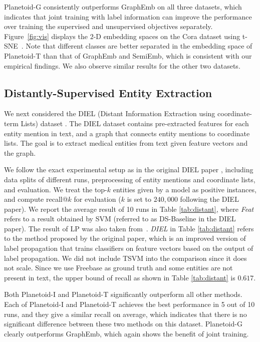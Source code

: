 Planetoid-G consistently outperforms GraphEmb on all three datasets, which indicates that joint training with label information can improve the performance over training the supervised and unsupervised objectives separately.
Figure~\ref{fig:vis} displays the $2$-D embedding spaces on the Cora dataset
using t-SNE~\cite{van2008visualizing}. Note that  
different classes are better separated in the embedding space of Planetoid-T than that of GraphEmb and SemiEmb, which is consistent with our empirical findings. We also observe similar results for the other two datasets.  



\subsection{Distantly-Supervised Entity Extraction}


We next considered the DIEL (Distant Information Extraction using coordinate-term Lists) dataset \cite{bingimproving}.
The DIEL dataset contains pre-extracted features for each entity mention in text, and a graph that connects entity mentions to coordinate lists. The goal is to extract medical entities from text given feature vectors and the graph.

We follow the exact experimental setup as in the original DIEL paper \cite{bingimproving}, including data splits of different runs, preprocessing of entity mentions and coordinate lists, and evaluation. We treat the top-$k$ entities given by a model as positive instances, and compute recall@$k$ for evaluation ($k$ is set to $240,000$ following the DIEL paper). We report the average result of 10 runs in Table \ref{tab:distant}, where \textit{Feat} refers to a result obtained by SVM (referred to as DS-Baseline in the DIEL paper). The result of LP was also taken from~\cite{bingimproving}. \textit{DIEL} in Table \ref{tab:distant} refers to the method proposed by the original paper, which is an improved version of label propagation that trains classifiers on feature vectors based on the output of label propagation. We did not include TSVM into the comparison since it does not scale.
Since we use Freebase as ground truth and some entities are not present in text, the upper bound of recall as shown in Table \ref{tab:distant} is $0.617$.

Both Planetoid-I and Planetoid-T significantly outperform all other methods.
Each of Planetoid-I and Planetoid-T achieves the best performance in 5 out of 10 runs, and they give a similar recall on average, which indicates that there is no significant difference between these two methods on this dataset. Planetoid-G clearly outperforms GraphEmb, which again shows the benefit of joint training.

